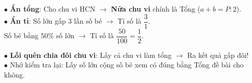 \documentclass[14pt,a4paper,oneside]{extbook}
\begin{document}
\noindent
\begin{minipage}[t]{0.54\textwidth}
  \begin{tcolorbox}[
    enhanced,
    title={\footnotesize\bfseries\color{white}\faSearch\ Dạng toán ``Ẩn Tổng'' hoặc ``Ẩn Tỉ''},
    colback=green!3!white,
    colframe=green!60!black,
    arc=2.5mm, boxrule=0.8pt, top=1.8mm, bottom=1.8mm, left=2.2mm, right=2.2mm
  ]
    \footnotesize
    $\bullet$ \textbf{Ẩn tổng}: Cho chu vi HCN $\rightarrow$ \textbf{Nửa chu vi} chính là Tổng ($a + b = P : 2$).\\
    $\bullet$ \textbf{Ẩn tỉ}: Số lớn gấp $3$ lần số bé $\rightarrow$ Tỉ số là $\dfrac{3}{1}$.\\
    Số bé bằng $50\%$ số lớn $\rightarrow$ Tỉ số là $\dfrac{50}{100} = \dfrac{1}{2}$.
  \end{tcolorbox}
\end{minipage}%
\hfill
\begin{minipage}[t]{0.44\textwidth}
  \begin{tcolorbox}[
    enhanced,
    title={\footnotesize\bfseries\color{white}\faExclamationTriangle\ Mẹo tránh bẫy trắc nghiệm},
    colback=red!2!white,
    colframe=red!70!black,
    arc=2.5mm, boxrule=0.8pt, top=1.8mm, bottom=1.8mm, left=2.2mm, right=2.2mm
  ]
    \footnotesize
    $\bullet$ \textbf{Lỗi quên chia đôi chu vi}: Lấy cả chu vi làm tổng $\rightarrow$ Ra kết quả gấp đôi!\\
    $\bullet$ Nhớ kiểm tra lại: Lấy số lớn cộng số bé xem có đúng bằng Tổng đề bài cho không.
  \end{tcolorbox}
\end{minipage}
\end{document}
